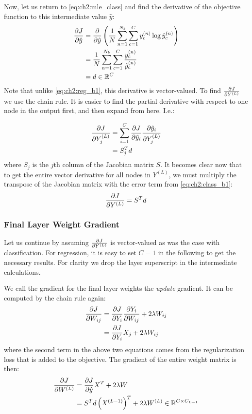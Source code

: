 Now, let us return to \eqref{eq:ch2:mle_class} and find the derivative of the
objective function to this intermediate value $\hat{y}$:
\begin{align}
  \dydx{J}{\hat{y}} &=  \dydx{}{\hat{y}} \left( \frac{1}{N}\sum_{n=1}^{N_b} \sum_{c=1}^C
  y^{(n)}_c \log \hat{y}^{(n)}_c \right) \\
  &= \frac{1}{N}\sum_{n=1}^{N_b} \sum_{c=1}^C \frac{y^{(n)}_c}{\hat{y}^{(n)}_c} \\
  &= d \in \reals[C] \label{eq:ch2:class_b1}
\end{align}
Note that unlike \eqref{eq:ch2:reg_b1}, this derivative is vector-valued. To
find $\dydx{J}{Y^{(L)}}$ we use the chain rule. It is easier to find the
partial derivative with respect to one node in the output first, and then expand
from here. I.e.:

\begin{align}
  \dydx{J}{Y^{(L)}_j} &= \sum_{i=1}^C \dydx{J}{\hat{y}_i}\dydx{\hat{y}_i}{Y^{(L)}_j} \\
                      &= S_j^T d
\end{align}
where $S_j$ is the $j$th column of the Jacobian matrix $S$. It becomes clear now
that to get the entire vector derivative for all nodes in $Y^{(L)}$, we must
multiply the transpose of the Jacobian matrix with the error term from
\eqref{eq:ch2:class_b1}:
\begin{equation}
  \dydx{J}{Y^{(L)}} = S^T d
\end{equation}

\subsubsection{Final Layer Weight Gradient} \label{sec:ch2:weight}
Let us continue by assuming $\dydx{J}{Y^{(L)}}$ is vector-valued as was the case
with classification. For regression, it is easy to set $C=1$ in the following to
get the necessary results. For clarity we drop the layer
superscript in the intermediate calculations.

We call the gradient for the final layer weights the \emph{update} gradient.
It can be computed by the chain rule again:
\begin{align}
  \dydx{J}{W_{ij}} &= \dydx{J}{Y_i} \dydx{Y_i}{W_{ij}} + 2\lambda W_{ij} \\
                   &= \dydx{J}{Y_i} X_j + 2\lambda W_{ij}
\end{align}
where the second term in the above two equations comes from the regularization
loss that is added to the objective. The gradient of the entire weight matrix is
then:
\begin{align}
  \dydx{J}{W^{(L)}} &= \dydx{J}{\hat{y}} X^T +2\lambda W \\
                    &= S^T d \left(X^{(L-1)}\right)^T + 2\lambda W^{(L)} \in \reals[C \x C_{L-1}]
\end{align}

